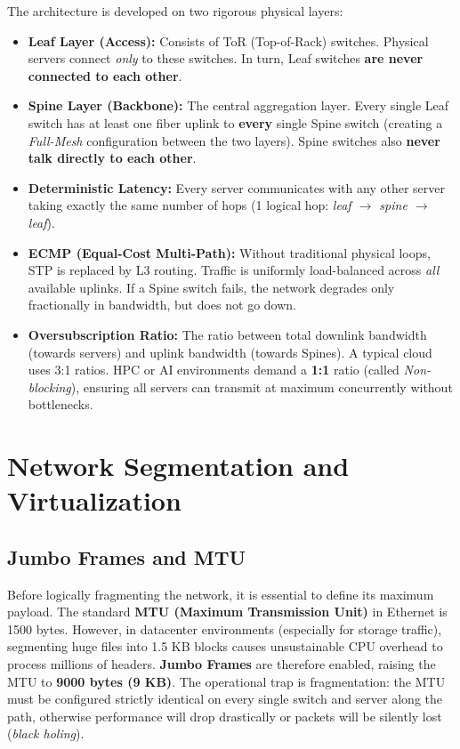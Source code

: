 The architecture is developed on two rigorous physical layers:
\begin{itemize}
    \item \textbf{Leaf Layer (Access):} Consists of ToR (Top-of-Rack) switches. Physical servers connect \textit{only} to these switches. In turn, Leaf switches \textbf{are never connected to each other}.
    \item \textbf{Spine Layer (Backbone):} The central aggregation layer. Every single Leaf switch has at least one fiber uplink to \textbf{every} single Spine switch (creating a \textit{Full-Mesh} configuration between the two layers). Spine switches also \textbf{never talk directly to each other}.
\end{itemize}

\begin{tipbox}
\begin{itemize}
    \item \textbf{Deterministic Latency:} Every server communicates with any other server taking exactly the same number of hops (1 logical hop: \textit{leaf $\rightarrow$ spine $\rightarrow$ leaf}).
    \item \textbf{ECMP (Equal-Cost Multi-Path):} Without traditional physical loops, STP is replaced by L3 routing. Traffic is uniformly load-balanced across \textit{all} available uplinks. If a Spine switch fails, the network degrades only fractionally in bandwidth, but does not go down.
    \item \textbf{Oversubscription Ratio:} The ratio between total downlink bandwidth (towards servers) and uplink bandwidth (towards Spines). A typical cloud uses 3:1 ratios. HPC or AI environments demand a \textbf{1:1} ratio (called \textit{Non-blocking}), ensuring all servers can transmit at maximum concurrently without bottlenecks.
\end{itemize}
\end{tipbox}

\section{Network Segmentation and Virtualization}

\subsection{Jumbo Frames and MTU}
Before logically fragmenting the network, it is essential to define its maximum payload. The standard \textbf{MTU (Maximum Transmission Unit)} in Ethernet is 1500 bytes. However, in datacenter environments (especially for storage traffic), segmenting huge files into 1.5 KB blocks causes unsustainable CPU overhead to process millions of headers. \textbf{Jumbo Frames} are therefore enabled, raising the MTU to \textbf{9000 bytes (9 KB)}.
The operational trap is fragmentation: the MTU must be configured strictly identical on every single switch and server along the path, otherwise performance will drop drastically or packets will be silently lost (\textit{black holing}).

